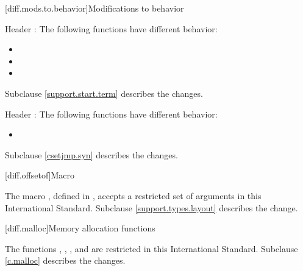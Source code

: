 [diff.mods.to.behavior]{Modifications to behavior}

\pnum
Header :
The following functions have different behavior:

\begin{itemize}
\item {}
\item {}
\item {}
\end{itemize}

Subclause \ref{support.start.term} describes the changes.

\pnum
Header :
The following functions have different behavior:
\begin{itemize}
\item {}
\end{itemize}

Subclause \ref{csetjmp.syn} describes the changes.

[diff.offsetof]{Macro }
%

\pnum
The macro , defined in
,
accepts a restricted set of  arguments in this International Standard.
Subclause \ref{support.types.layout} describes the change.

[diff.malloc]{Memory allocation functions}

\pnum
The functions
,
,
,
and
are restricted in this International Standard.
Subclause \ref{c.malloc} describes the changes.
